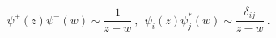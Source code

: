 \begin{equation}
 \psi^+ (z) \psi^- (w) \sim \frac{1}{z-w} ~,~~
 \psi_i (z) \psi_j^* (w) \sim  \frac{\delta_{ij}}{z-w} ~.
\end{equation}

